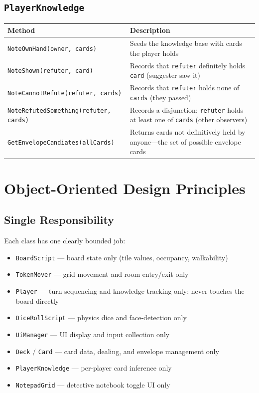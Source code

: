 \subsection*{\texttt{PlayerKnowledge}}

\begin{table}[H]
\centering
\footnotesize
\setlength{\tabcolsep}{4pt}
\begin{tabular}{|p{4.2cm}|p{5.5cm}|}
\hline
\textbf{Method} & \textbf{Description} \\ \hline
\texttt{NoteOwnHand(\allowbreak owner, cards)} & Seeds the knowledge base with cards the player holds \\ \hline
\texttt{NoteShown(\allowbreak refuter, card)} & Records that \texttt{refuter} definitely holds \texttt{card} (suggester saw it) \\ \hline
\texttt{NoteCannotRefute(\allowbreak refuter, cards)} & Records that \texttt{refuter} holds none of \texttt{cards} (they passed) \\ \hline
\texttt{NoteRefutedSomething(\allowbreak refuter, cards)} & Records a disjunction: \texttt{refuter} holds at least one of \texttt{cards} (other observers) \\ \hline
\texttt{GetEnvelopeCandiates(\allowbreak allCards)} & Returns cards not definitively held by anyone---the set of possible envelope cards \\ \hline
\end{tabular}
\end{table}

\section{Object-Oriented Design Principles}

\subsection*{Single Responsibility}
Each class has one clearly bounded job:
\begin{itemize}
    \item \texttt{BoardScript} --- board state only (tile values, occupancy, walkability)
    \item \texttt{TokenMover} --- grid movement and room entry/exit only
    \item \texttt{Player} --- turn sequencing and knowledge tracking only; never touches the board directly
    \item \texttt{DiceRollScript} --- physics dice and face-detection only
    \item \texttt{UiManager} --- UI display and input collection only
    \item \texttt{Deck} / \texttt{Card} --- card data, dealing, and envelope management only
    \item \texttt{PlayerKnowledge} --- per-player card inference only
    \item \texttt{NotepadGrid} --- detective notebook toggle UI only
\end{itemize}

